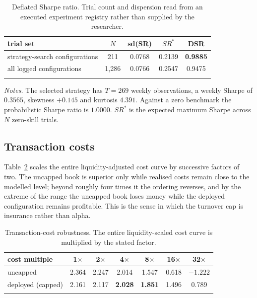 \documentclass[11pt,letterpaper]{article}
\begin{document}
\begin{table}[!htbp]\centering
\caption{Deflated Sharpe ratio. Trial count and dispersion read from an executed
experiment registry rather than supplied by the researcher.}\label{tab:dsr}
\begin{tabular}{lcccc}
\toprule
trial set & $N$ & sd(SR) & $SR^{*}$ & DSR \\
\midrule\addlinespace[2pt]
strategy-search configurations & 211 & 0.0768 & 0.2139 & \textbf{0.9885} \\
all logged configurations & 1{,}286 & 0.0766 & 0.2547 & 0.9475 \\
\addlinespace[2pt]
\bottomrule
\end{tabular}

\vspace{4pt}
\begin{minipage}{0.86\textwidth}\footnotesize
\emph{Notes.} The selected strategy has $T=269$ weekly observations, a weekly
Sharpe of $0.3565$, skewness $+0.145$ and kurtosis $4.391$. Against a zero
benchmark the probabilistic Sharpe ratio is $1.0000$. $SR^{*}$ is the expected
maximum Sharpe across $N$ zero-skill trials.
\end{minipage}
\end{table}

\subsection{Transaction costs}

Table~\ref{tab:cost} scales the entire liquidity-adjusted cost curve by
successive factors of two. The uncapped book is superior only while realised
costs remain close to the modelled level; beyond roughly four times it the
ordering reverses, and by the extreme of the range the uncapped book loses money
while the deployed configuration remains profitable. This is the sense in which
the turnover cap is insurance rather than alpha.

\begin{table}[!htbp]\centering
\caption{Transaction-cost robustness. The entire liquidity-scaled cost curve is
multiplied by the stated factor.}\label{tab:cost}
\begin{tabular}{lcccccc}
\toprule
cost multiple & 1$\times$ & 2$\times$ & 4$\times$ & 8$\times$ & 16$\times$ & 32$\times$ \\
\midrule\addlinespace[2pt]
uncapped & 2.364 & 2.247 & 2.014 & 1.547 & 0.618 & $-1.222$ \\
deployed (capped) & 2.161 & 2.117 & \textbf{2.028} & \textbf{1.851} & 1.496 & 0.789 \\
\addlinespace[2pt]
\bottomrule
\end{tabular}
\end{table}
\end{document}
